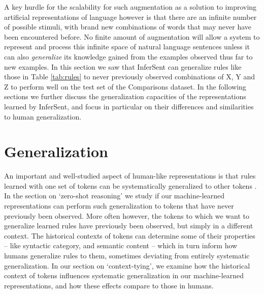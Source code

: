 A key hurdle for the scalability for such augmentation as a solution to improving artificial representations of language however is that there are an infinite number of possible stimuli, with brand new combinations of words that may never have been encountered before. No finite amount of augmentation will allow a system to represent and process this infinite space of natural language sentences unless it can also \textit{generalize} its knowledge gained from the examples observed thus far to new examples. In this section we saw that InferSent can generalize rules like those in Table \ref{tab:rules} to never previously observed combinations of X, Y and Z to perform well on the test set of the Comparisons dataset. In the following sections we further discuss the generalization capacities of the representations learned by InferSent, and focus in particular on their differences and similarities to human generalization.

\section{Generalization}
An important and well-studied aspect of human-like representations is that rules learned with one set of tokens can be systematically generalized to other tokens \citep{fodor88, lake2019human}. In the section on `zero-shot reasoning' we study if our machine-learned representations can perform such generalization to tokens that have never previously been observed. More often however, the tokens to which we want to generalize learned rules have previously been observed, but simply in a different context. The historical contexts of tokens can determine some of their properties -- like syntactic category, and semantic content -- which in turn inform how humans generalize rules to them, sometimes deviating from entirely systematic generalization. In our section on `context-tying', we examine how the historical context of tokens influences systematic generalization in our machine-learned representations, and how these effects compare to those in humans.



